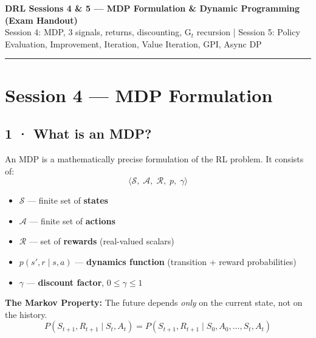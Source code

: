 \documentclass[11pt,a4paper]{article}
\begin{document}
\begin{center}
  {\large\bfseries DRL Sessions 4 \& 5 — MDP Formulation \& Dynamic Programming (Exam Handout)}\\[2pt]
  {\small Session 4: MDP, 3 signals, returns, discounting, G\(_t\) recursion \quad|\quad
   Session 5: Policy Evaluation, Improvement, Iteration, Value Iteration, GPI, Async DP}
\end{center}
\hrule\vspace{6pt}

\section*{Session 4 — MDP Formulation}

\subsection*{1 · What is an MDP?}

\begin{tcolorbox}[defn={Markov Decision Process (MDP)}]
An MDP is a mathematically precise formulation of the RL problem.
It consists of:
\[
  \langle \mathcal{S},\; \mathcal{A},\; \mathcal{R},\; p,\; \gamma \rangle
\]
\begin{itemize}
  \item $\mathcal{S}$ — finite set of \textbf{states}
  \item $\mathcal{A}$ — finite set of \textbf{actions}
  \item $\mathcal{R}$ — set of \textbf{rewards} (real-valued scalars)
  \item $p(s', r \mid s, a)$ — \textbf{dynamics function} (transition + reward probabilities)
  \item $\gamma$ — \textbf{discount factor}, $0 \leq \gamma \leq 1$
\end{itemize}
\end{tcolorbox}

\textbf{The Markov Property:} The future depends \emph{only} on the current state, not on the history.
\[
  P(S_{t+1}, R_{t+1} \mid S_t, A_t) = P(S_{t+1}, R_{t+1} \mid S_0, A_0, \ldots, S_t, A_t)
\]

\end{document}

